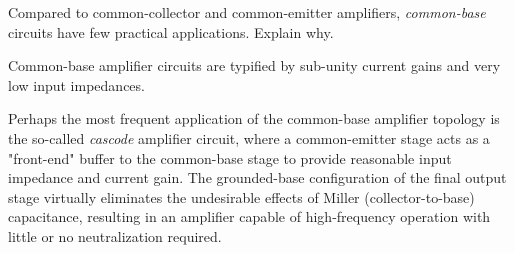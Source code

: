 

Compared to common-collector and common-emitter amplifiers, {\it common-base} circuits have few practical applications.  Explain why.







Common-base amplifier circuits are typified by sub-unity current gains and very low input impedances.







Perhaps the most frequent application of the common-base amplifier topology is the so-called {\it cascode} amplifier circuit, where a common-emitter stage acts as a "front-end" buffer to the common-base stage to provide reasonable input impedance and current gain.  The grounded-base configuration of the final output stage virtually eliminates the undesirable effects of Miller (collector-to-base) capacitance, resulting in an amplifier capable of high-frequency operation with little or no neutralization required.




